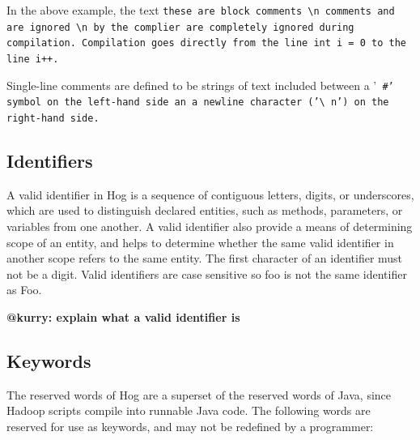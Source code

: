 \documentclass{article}
\begin{document}
In the above example, the text \tt these are block comments \textbackslash n comments and are ignored \textbackslash n by the
complier \rm are completely ignored during compilation. Compilation goes directly from the line \tt int i = 0 \rm to the line
\tt i++\rm.

Single-line comments are defined to be strings of text included between a '\tt
\#\rm' symbol on the left-hand side an a newline character ('\tt\textbackslash
n\rm') on the right-hand side.


\subsection{Identifiers} %
\label{sub:identifiers}

A valid identifier in Hog is a sequence of contiguous letters, digits, or
underscores, which are used to distinguish declared entities, such as 
methods, parameters, or variables from one another. A valid identifier also
provide a means of determining scope of an entity, and helps to determine whether
the same valid identifier in another scope refers to the same entity. The first
character of an identifier must not be a digit. Valid identifiers are case sensitive
so foo is not the same identifier as Foo.

\textbf{@kurry: explain what a valid identifier is}


\subsection{Keywords} %
\label{sub:keywords}

The reserved words of Hog are a superset of the reserved words of Java, since
Hadoop scripts compile into runnable Java code. The following words are reserved
for use as keywords, and may not be redefined by a programmer:
\end{document}
